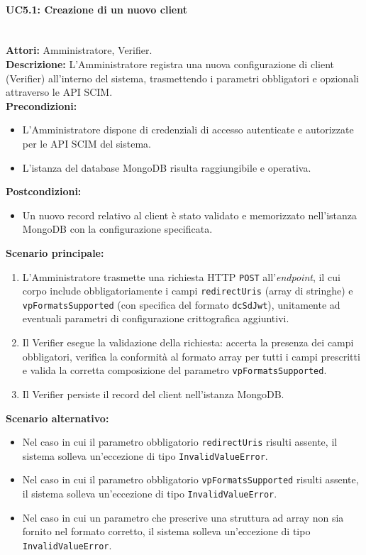 \paragraph{\large\bfseries UC5.1: Creazione di un nuovo client}
\label{uc:verifier:uc5.1}
\mbox{}\\
\noindent\textbf{Attori:} Amministratore, Verifier.
\\
\noindent\textbf{Descrizione:} L'Amministratore registra una nuova configurazione di client (Verifier) all'interno del sistema, trasmettendo i parametri obbligatori e opzionali attraverso le API SCIM.
\\
\noindent\textbf{Precondizioni:}
\begin{itemize}
    \item L'Amministratore dispone di credenziali di accesso autenticate e autorizzate per le API SCIM del sistema.
    \item L'istanza del database MongoDB risulta raggiungibile e operativa.
\end{itemize}
\noindent\textbf{Postcondizioni:}
\begin{itemize}
    \item Un nuovo record relativo al client è stato validato e memorizzato nell'istanza MongoDB con la configurazione specificata.
\end{itemize}

\noindent\textbf{Scenario principale:}
\begin{enumerate}
    \item L'Amministratore trasmette una richiesta HTTP \texttt{POST} all'\textit{endpoint}, il cui corpo include obbligatoriamente i campi \texttt{redirectUris} (array di stringhe) e \texttt{vpFormatsSupported} (con specifica del formato \texttt{dcSdJwt}), unitamente ad eventuali parametri di configurazione crittografica aggiuntivi.
    \item Il Verifier esegue la validazione della richiesta: accerta la presenza dei campi obbligatori, verifica la conformità al formato array per tutti i campi prescritti e valida la corretta composizione del parametro \texttt{vpFormatsSupported}.
    \item Il Verifier persiste il record del client nell'istanza MongoDB.
\end{enumerate}

\noindent\textbf{Scenario alternativo:}
\begin{itemize}
    \item Nel caso in cui il parametro obbligatorio \texttt{redirectUris} risulti assente, il sistema solleva un'eccezione di tipo \texttt{InvalidValueError}.
    \item Nel caso in cui il parametro obbligatorio \texttt{vpFormatsSupported} risulti assente, il sistema solleva un'eccezione di tipo \texttt{InvalidValueError}.
    \item Nel caso in cui un parametro che prescrive una struttura ad array non sia fornito nel formato corretto, il sistema solleva un'eccezione di tipo \texttt{InvalidValueError}.
\end{itemize}

